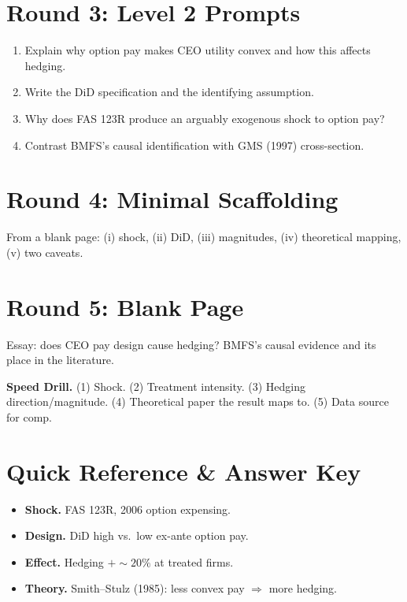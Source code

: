 \documentclass[11pt]{article}
\begin{document}
\section*{Round 3: Level 2 Prompts}
\begin{enumerate}
\item Explain why option pay makes CEO utility convex and how this affects hedging.
\item Write the DiD specification and the identifying assumption.
\item Why does FAS 123R produce an arguably exogenous shock to option pay?
\item Contrast BMFS's causal identification with GMS (1997) cross-section.
\end{enumerate}

\section*{Round 4: Minimal Scaffolding}
From a blank page: (i) shock, (ii) DiD, (iii) magnitudes, (iv) theoretical mapping, (v) two caveats.

\section*{Round 5: Blank Page}
Essay: does CEO pay design cause hedging? BMFS's causal evidence and its place in the literature.

\vspace{6pt}
\begin{drillbox}
\textbf{Speed Drill.} (1) Shock. (2) Treatment intensity. (3) Hedging direction/magnitude. (4) Theoretical paper the result maps to. (5) Data source for comp.
\end{drillbox}

\section*{Quick Reference \& Answer Key}
\begin{answerbox}
\begin{itemize}
\item \textbf{Shock.} FAS 123R, 2006 option expensing.
\item \textbf{Design.} DiD high vs.\ low ex-ante option pay.
\item \textbf{Effect.} Hedging $+\sim\!20\%$ at treated firms.
\item \textbf{Theory.} Smith--Stulz (1985): less convex pay $\Rightarrow$ more hedging.
\end{itemize}
\end{answerbox}
\end{document}
